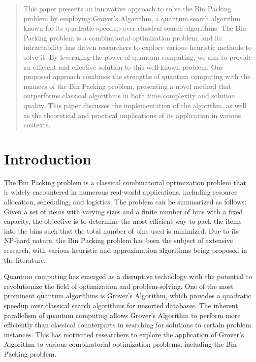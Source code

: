 \begin{abstract}
This paper presents an innovative approach to solve the Bin Packing problem by employing Grover's Algorithm, a quantum search algorithm known for its quadratic speedup over classical search algorithms. The Bin Packing problem is a combinatorial optimization problem, and its intractability has driven researchers to explore various heuristic methods to solve it. By leveraging the power of quantum computing, we aim to provide an efficient and effective solution to this well-known problem. Our proposed approach combines the strengths of quantum computing with the nuances of the Bin Packing problem, presenting a novel method that outperforms classical algorithms in both time complexity and solution quality. This paper discusses the implementation of the algorithm, as well as the theoretical and practical implications of its application in various contexts.

\end{abstract}

\section{Introduction}

The Bin Packing problem is a classical combinatorial optimization problem that is widely encountered in numerous real-world applications, including resource allocation, scheduling, and logistics. The problem can be summarized as follows: Given a set of items with varying sizes and a finite number of bins with a fixed capacity, the objective is to determine the most efficient way to pack the items into the bins such that the total number of bins used is minimized. Due to its NP-hard nature, the Bin Packing problem has been the subject of extensive research, with various heuristic and approximation algorithms being proposed in the literature.

Quantum computing has emerged as a disruptive technology with the potential to revolutionize the field of optimization and problem-solving. One of the most prominent quantum algorithms is Grover's Algorithm, which provides a quadratic speedup over classical search algorithms for unsorted databases. The inherent parallelism of quantum computing allows Grover's Algorithm to perform more efficiently than classical counterparts in searching for solutions to certain problem instances. This has motivated researchers to explore the application of Grover's Algorithm to various combinatorial optimization problems, including the Bin Packing problem.

